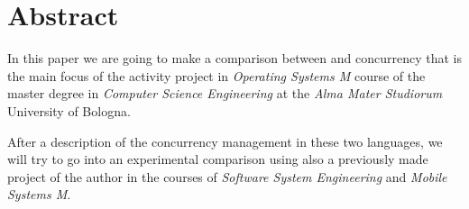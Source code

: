 \section*{Abstract}

In this paper we are going to make a comparison between \Kotlin and \Go concurrency that is the main focus of the activity project in \textit{Operating Systems M} course of the master degree in \textit{Computer Science Engineering} at the \textit{Alma Mater Studiorum} University of Bologna.

After a description of the concurrency management in these two languages, we will try to go into an experimental comparison using also a previously made project of the author in the courses of \textit{Software System Engineering} and \textit{Mobile Systems M}. 

